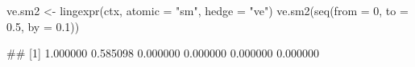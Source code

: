 \begin{Schunk}
% --begin: "lingexpr"
\begin{Sinput}
ve.sm2 <- lingexpr(ctx, atomic = "sm", hedge = "ve")
ve.sm2(seq(from = 0, to = 0.5, by = 0.1))
\end{Sinput}
\begin{Soutput}
## [1] 1.000000 0.585098 0.000000 0.000000 0.000000 0.000000
\end{Soutput}
%
% --end: "lingexpr"
\end{Schunk}
